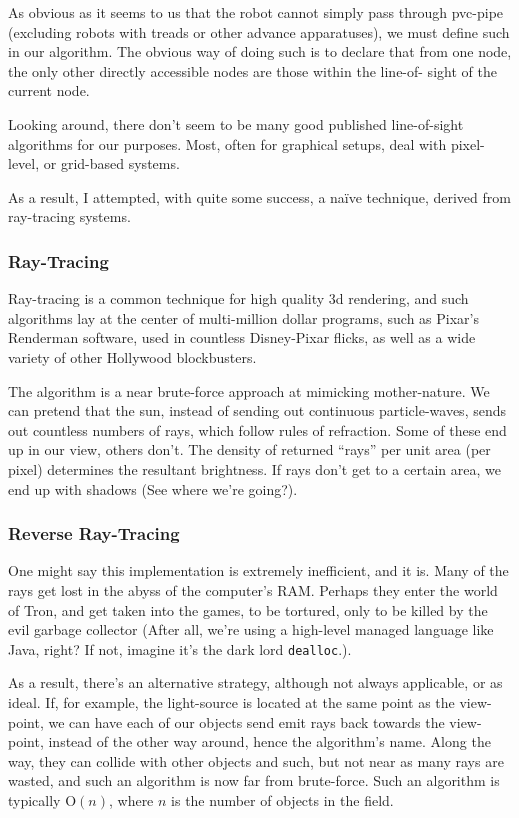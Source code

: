 \documentclass[letterpaper, 12pt]{article}
\begin{document}
\begin{multicols}{2}
As obvious as it seems to us that the robot cannot simply pass through pvc-pipe
(excluding robots with treads or other advance apparatuses), we must define such
in our algorithm. The obvious way of doing such is to declare that from one
node, the only other directly accessible nodes are those within the line-of-
sight of the current node.

Looking around, there don't seem to be many good published line-of-sight
algorithms for our purposes. Most, often for graphical setups, deal with pixel-
level, or grid-based systems.

As a result, I attempted, with quite some success, a na\"ive technique, derived
from ray-tracing systems.

\subsubsection{Ray-Tracing}

Ray-tracing is a common technique for high quality 3d rendering, and such
algorithms lay at the center of multi-million dollar programs, such as Pixar's
Renderman software, used in countless Disney-Pixar flicks, as well as a wide
variety of other Hollywood blockbusters.

The algorithm is a near brute-force approach at mimicking mother-nature. We can
pretend that the sun, instead of sending out continuous particle-waves, sends
out countless numbers of rays, which follow rules of refraction. Some of these
end up in our view, others don't. The density of returned ``rays'' per unit area
(per pixel) determines the resultant brightness. If rays don't get to a certain
area, we end up with shadows (See where we're going?).

\subsubsection{Reverse Ray-Tracing}

One might say this implementation is extremely inefficient, and it is. Many of
the rays get lost in the abyss of the computer's RAM. Perhaps they enter the
world of Tron, and get taken into the games, to be tortured, only to be killed
by the evil garbage collector (After all, we're using a high-level managed
language like Java, right? If not, imagine it's the dark lord
\texttt{dealloc}.).

As a result, there's an alternative strategy, although not always applicable, or
as ideal. If, for example, the light-source is located at the same point as the
view-point, we can have each of our objects send emit rays back towards the
view-point, instead of the other way around, hence the algorithm's name. Along
the way, they can collide with other objects and such, but not near as many rays
are wasted, and such an algorithm is now far from brute-force. Such an algorithm
is typically \(\mathrm{O}(n)\), where \(n\) is the number of objects in the
field.


\end{multicols}
\end{document}
